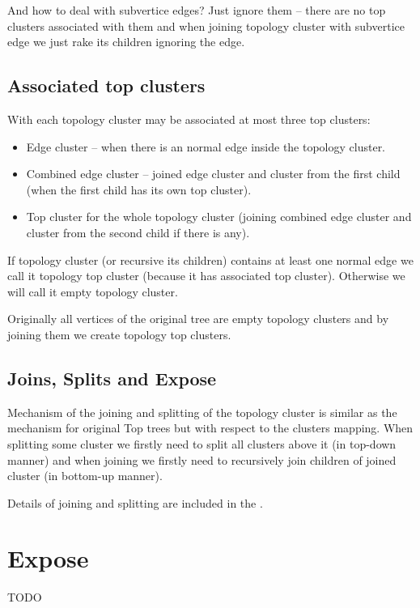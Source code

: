 And how to deal with subvertice edges? Just ignore them -- there are no top
clusters associated with them and when joining topology cluster with subvertice
edge we just rake its children ignoring the edge.

\subsection{Associated top clusters}

With each topology cluster may be associated at most three top clusters:
\begin{itemize}
\item {\I Edge cluster} -- when there is an normal edge inside the topology cluster.
\item {\I Combined edge cluster} -- joined {\I edge cluster} and cluster from
the first child (when the first child has its own top cluster).
\item {\I Top cluster} for the whole topology cluster (joining {\I combined edge
cluster} and cluster from the second child if there is any).
\end{itemize}

If topology cluster (or recursive its children) contains at least one normal
edge we call it {\I topology top cluster} (because it has associated top
cluster). Otherwise we will call it {\I empty topology cluster}.

Originally all vertices of the original tree are empty topology clusters and by
joining them we create topology top clusters.

\subsection{Joins, Splits and Expose}

Mechanism of the joining and splitting of the topology cluster is similar as the
mechanism for original Top trees but with respect to the clusters mapping. When
splitting some cluster we firstly need to split all clusters above it (in
top-down manner) and when joining we firstly need to recursively join children
of joined cluster (in bottom-up manner).

Details of joining and splitting are included in the .

\section{Expose}

TODO
